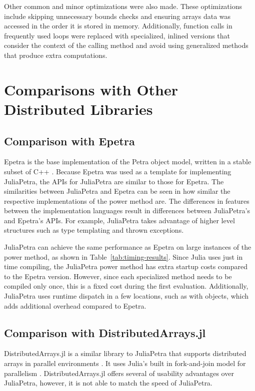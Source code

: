 \documentclass[acmsmall]{acmart}
\newcommand{\snippet}[1]{\texttt{\detokenize{#1}}}
\begin{document}
	Other common and minor optimizations were also made.
	These optimizations include skipping unnecessary bounds checks
	and ensuring arrays data was accessed in the order it is stored in memory.
	Additionally, function calls in frequently used loops were replaced with specialized, inlined versions that consider the context of the calling method and avoid using generalized methods that produce extra computations.
	
	\section{Comparisons with Other Distributed Libraries}
	
	\subsection{Comparison with Epetra}
	
	Epetra is the base implementation of the Petra object model,
	written in a stable subset of C++ \cite{Heroux:2005:Trilinos}.
	Because Epetra was used as a template for implementing JuliaPetra,
	the APIs for JuliaPetra are similar to those for Epetra.
	The similarities between JuliaPetra and Epetra can be seen in how similar the respective implementations
	of the power method are.
	The differences in features between the implementation languages result in differences
	between JuliaPetra's and Epetra's APIs.
	For example, JuliaPetra takes advantage of higher level structures
	such as type templating and thrown exceptions.
	
	JuliaPetra can achieve the same performance as Epetra on large instances of the power method, as shown in Table~\ref{tab:timing-results}.
	Since Julia uses just in time compiling, the JuliaPetra power method has extra startup costs compared to
	the Epetra version. However, since each specialized method needs to be compiled only once,
	this is a fixed cost during the first evaluation.
	Additionally, JuliaPetra uses runtime dispatch in a few locations, such as with
	\snippet{Comm} objects, which adds additional overhead compared to Epetra.
	
	\subsection{Comparison with DistributedArrays.jl}
	
	DistributedArrays.jl is a similar library to JuliaPetra that supports
	distributed arrays in parallel environments \cite{Github:DA}.
	It uses Julia's built in fork-and-join model for parallelism
	\cite{Bezanson:2017:FreshApproach}.
	DistributedArrays.jl offers several of usability advantages over JuliaPetra, however, it is not able to match the speed of JuliaPetra.
	
\end{document}
